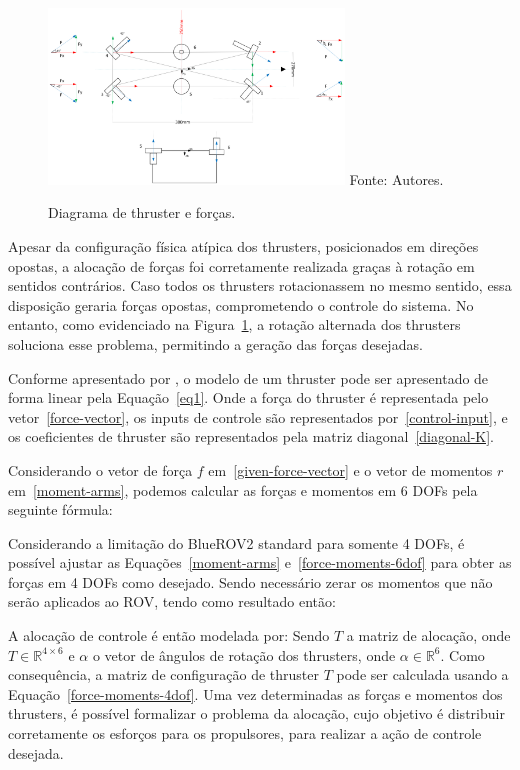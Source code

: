 \documentclass[../main.tex]{subfiles}
\begin{document}
\begin{figure}[H]
  \centering
  \caption{Diagrama de thruster e forças.}
  \includegraphics[width=0.7\textwidth]{images/Alocaçao-thrusters-vetor-força-blureov2-light.png}
  \vfill
  Fonte: Autores.
  \label{force_diagram}
\end{figure}

Apesar da configuração física atípica dos thrusters, posicionados em direções opostas, a alocação de forças foi corretamente realizada graças à rotação em sentidos contrários. Caso todos os thrusters rotacionassem no mesmo sentido, essa disposição geraria forças opostas, comprometendo o controle do sistema. No entanto, como evidenciado na Figura~\ref{force_diagram}, a rotação alternada dos thrusters soluciona esse problema, permitindo a geração das forças desejadas.

Conforme apresentado por \cite{wu20186}, o modelo de um thruster pode ser apresentado de forma linear pela Equação~\ref{eq1}. Onde a força do thruster é representada pelo vetor~\ref{force-vector}, os inputs de controle são representados por~\ref{control-input}, e os coeficientes de thruster são representados pela matriz diagonal~\ref{diagonal-K}.

\modelA
\vetorF
\vetorU
\vetorK

Considerando o vetor de força $f$ em~\ref{given-force-vector} e o vetor de momentos $r$ em~\ref{moment-arms}, podemos calcular as forças e momentos em 6 DOFs pela seguinte fórmula:
\vetorFmin
\vetorR
\modelB

Considerando a limitação do BlueROV2 standard para somente 4 DOFs, é possível ajustar as Equações~\ref{moment-arms} e~\ref{force-moments-6dof} para obter as forças em 4 DOFs como desejado. Sendo necessário zerar os momentos que não serão aplicados ao ROV, tendo como resultado então:
\vetorRfour
\modelfourdofs

A alocação de controle é então modelada por:
\generalisedTau
Sendo $T$ a matriz de alocação, onde $T \in \mathbb{R}^{4 \times 6}$ e $\alpha$ o vetor de ângulos de rotação dos thrusters, onde $\alpha \in \mathbb{R}^{6}$. Como consequência, a matriz de configuração de thruster $T$ pode ser calculada usando a Equação~\ref{force-moments-4dof}. Uma vez determinadas as forças e momentos dos thrusters, é possível formalizar o problema da alocação, cujo objetivo é distribuir corretamente os esforços para os propulsores, para realizar a ação de controle desejada.
\end{document}
